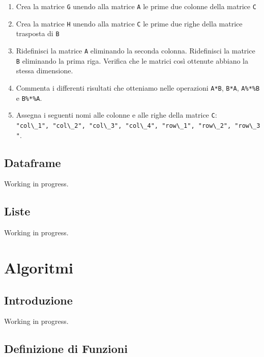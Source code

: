 \documentclass[
]{book}
\providecommand{\tightlist}{%
  \setlength{\itemsep}{0pt}\setlength{\parskip}{0pt}}
\begin{document}
\begin{enumerate}
\def\labelenumi{\arabic{enumi}.}
\tightlist
\item
  Crea la matrice \texttt{G} unendo alla matrice \texttt{A} le prime due colonne della matrice \texttt{C}
\item
  Crea la matrice \texttt{H} unendo alla matrice \texttt{C} le prime due righe della matrice trasposta di \texttt{B}
\item
  Ridefinisci la matrice \texttt{A} eliminando la seconda colonna. Ridefinisci la matrice \texttt{B} eliminando la prima riga. Verifica che le matrici così ottenute abbiano la stessa dimensione.
\item
  Commenta i differenti risultati che otteniamo nelle operazioni \texttt{A*B}, \texttt{B*A}, \texttt{A\%*\%B} e \texttt{B\%*\%A}.
\item
  Assegna i seguenti nomi alle colonne e alle righe della matrice \texttt{C}: \texttt{"col\textbackslash{}\_1",\ "col\textbackslash{}\_2",\ "col\textbackslash{}\_3",\ "col\textbackslash{}\_4",\ "row\textbackslash{}\_1",\ "row\textbackslash{}\_2",\ "row\textbackslash{}\_3"}.
\end{enumerate}

\hypertarget{dataframe}{%
\chapter{Dataframe}\label{dataframe}}

Working in progress.

\hypertarget{list}{%
\chapter{Liste}\label{list}}

Working in progress.

\hypertarget{part-algoritmi}{%
\part*{Algoritmi}\label{part-algoritmi}}

\hypertarget{introduzione-1}{%
\chapter*{Introduzione}\label{introduzione-1}}

Working in progress.

\hypertarget{functions}{%
\chapter{Definizione di Funzioni}\label{functions}}
\end{document}
